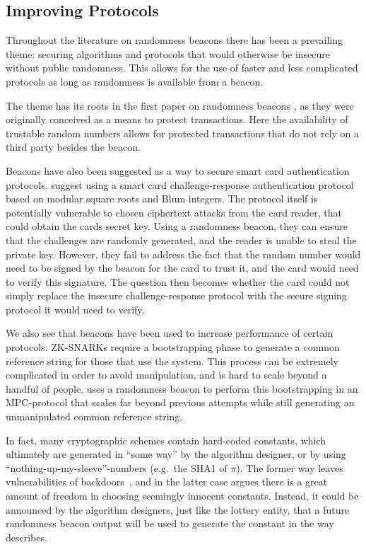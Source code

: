 \subsection{Improving Protocols}
Throughout the literature on randomness beacons there has been a prevailing theme: securing algorithms and protocols that would otherwise be insecure without public randomness. This allows for the use of faster and less complicated protocols as long as randomness is available from a beacon.

The theme has its roots in the first paper on randomness beacons \cite{rabin1983transaction}, as they were originally conceived as a means to protect transactions. Here the availability of trustable random numbers allows for protected transactions that do not rely on a third party besides the beacon.

Beacons have also been suggested as a way to secure smart card authentication protocols. \citet{fischer2011publicrandomnessservice} suggest using a smart card challenge-response authentication protocol based on modular square roots and Blum integers. The protocol itself is potentially vulnerable to chosen ciphertext attacks from the card reader, that could obtain the cards secret key. Using a randomness beacon, they can ensure that the challenges are randomly generated, and the reader is unable to steal the private key. However, they fail to address the fact that the random number would need to be signed by the beacon for the card to trust it, and the card would need to verify this signature. The question then becomes whether the card could not simply replace the insecure challenge-response protocol with the secure signing protocol it would need to verify.

We also see that beacons have been used to increase performance of certain protocols. ZK-SNARKs require a bootstrapping phase to generate a common reference string for those that use the system. This process can be extremely complicated in order to avoid manipulation, and is hard to scale beyond a handful of people.  uses a randomness beacon to perform this bootstrapping in an MPC-protocol that scales far beyond previous attempts while still generating an unmanipulated common reference string.

In fact, many cryptographic schemes contain hard-coded constants, which ultimately are generated in \enquote{some way} by the algorithm designer, or by using \enquote{nothing-up-my-sleeve}-numbers (e.g.\ the SHA1 of $\pi$).
The former way leaves vulnerabilities of backdoors~, and in the latter case  argues there is a great amount of freedom in choosing seemingly innocent constants.
Instead, it could be announced by the algorithm designers, just like the lottery entity, that a future randomness beacon output will be used to generate the constant in the way  describes.